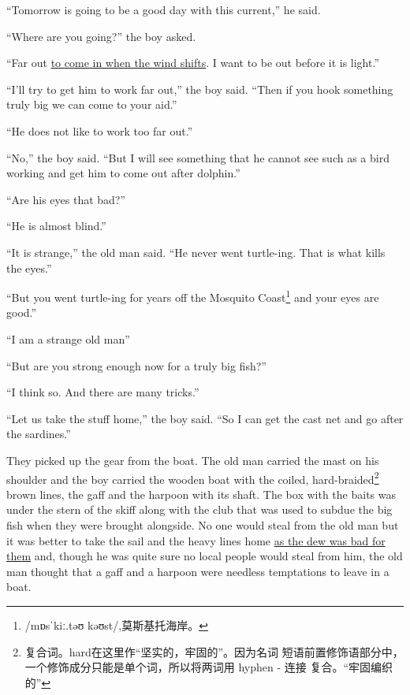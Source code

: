 \documentclass[fontset=ubuntu,zihao=-4]{ctexrep}
\newcommand\doulos[1]{{\fontspec{Doulos SIL} /#1/}}
\begin{document}
``Tomorrow is going to be a good day with this current,'' he said.

``Where are you going?'' the boy asked.

``Far out \uline{to come in when the wind \glspl{shift}}. I want to be out before it is light.''

``I'll try to get him to work far out,'' the boy said. ``Then if you \gls{hook} something truly big we can come to your \gls{aid}.''

``He does not like to work too far out.''

``No,'' the boy said. ``But I will see something that he cannot see such as a bird working and get him to come out after \gls{dolphin}.''

``Are his eyes that bad?''

``He is almost blind.''

``It is strange,'' the old man said. ``He never went \gls{turtle}-ing. That is what kills the eyes.''

``But you went turtle-ing for years off the Mosquito
Coast\footnote{\doulos{mɒsˈkiː.təʊ kəʊst},莫斯基托海岸。 } and your eyes
are good.''

``I am a \gls{strange} old man''

``But are you strong enough now for a truly big fish?''

``I think so. And there are many \glspl{trick}.''

``Let us take the \gls{stuff} home,'' the boy said. ``So I can get the \gls{cast} net and go after the sardines.''

They picked up the \gls{gear} from the boat. The old man carried the mast on
his \gls{shoulder} and the boy carried the wooden boat with the coiled,
hard-\gls{braided}\footnote{复合词。hard在这里作“坚实的，牢固的”。因为名词
  短语前置修饰语部分中，一个修饰成分只能是单个词，所以将两词用 hyphen - 连接
  复合。“牢固编织的”} brown lines, the gaff and the harpoon with its
\gls{shaft}. The box with the baits was under the \gls{stern} of the
skiff along with the club that was used to \gls{subdue} the big fish
when they were brought \gls{alongside}. No one would \gls{steal} from the
old man but it was better to take the sail and the heavy lines home \uline{as
the \gls{dew} was bad for them} and, though he was quite sure no local people
would steal from him, the old man thought that a gaff and a harpoon were
\gls{needless} \glspl{temptation} to leave in a boat.
\end{document}
